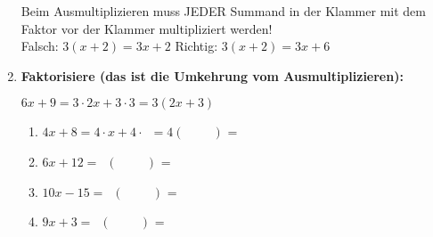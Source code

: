 \begin{enumerate}[label=\arabic*.]
    \vspace{1cm}

    \begin{warnbox}
        Beim Ausmultiplizieren muss JEDER Summand in der Klammer mit dem Faktor vor der Klammer multipliziert werden!\\
        Falsch: $3(x + 2) = 3x + 2$ \quad Richtig: $3(x + 2) = 3x + 6$
    \end{warnbox}

    \item \textbf{Faktorisiere (das ist die Umkehrung vom Ausmultiplizieren):}

    \vspace{0.5cm}

    \begin{beispielbox}[Beispiel]
        $6x + 9 = 3 \cdot 2x + 3 \cdot 3 = 3(2x + 3)$
    \end{beispielbox}

    \vspace{0.5cm}

    \begin{enumerate}[label=\alph*)]
        \item $4x + 8 = 4 \cdot x + 4 \cdot \phantom{0} = 4(\phantom{x + 0})$ = \underline{\hspace{3cm}}
        \vspace{0.5cm}
        \item $6x + 12 = \phantom{0}(\phantom{x + 0})$ = \underline{\hspace{3cm}}
        \vspace{0.5cm}
        \item $10x - 15 = \phantom{0}(\phantom{x - 0})$ = \underline{\hspace{3cm}}
        \vspace{0.5cm}
        \item $9x + 3 = \phantom{0}(\phantom{x + 0})$ = \underline{\hspace{3cm}}
    \end{enumerate}

\end{enumerate}